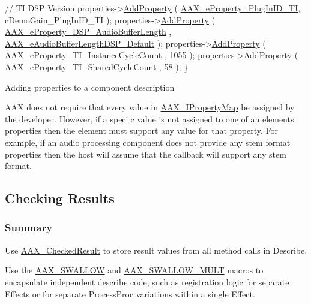 \begin{DoxyCode}
    \textcolor{comment}{// TI DSP Version}
    properties->\hyperlink{a00112_a0997671afce9a2367662c764c1d055dd}{AddProperty} ( \hyperlink{a00283_a6571f4e41a5dd06e4067249228e2249ea75f174df4efbeca86eaada126c1d9214}{AAX\_eProperty\_PlugInID\_TI}, 
      cDemoGain\_PlugInID\_TI );
    properties->\hyperlink{a00112_a0997671afce9a2367662c764c1d055dd}{AddProperty} ( \hyperlink{a00283_a6571f4e41a5dd06e4067249228e2249ea09fbd1cbcae0e86ad81005258dc1b67e}{AAX\_eProperty\_DSP\_AudioBufferLength}
      , \hyperlink{a00206_ab33e0f1ecf04ca4161fa8d8de5845d67ad1a72546e5300b5c64a19e8e41d12e15}{AAX\_eAudioBufferLengthDSP\_Default} );
    properties->\hyperlink{a00112_a0997671afce9a2367662c764c1d055dd}{AddProperty} ( \hyperlink{a00283_a6571f4e41a5dd06e4067249228e2249ea5d8e5be9f3698a9c67a578c29da66405}{AAX\_eProperty\_TI\_InstanceCycleCount}
      , 1055 );
    properties->\hyperlink{a00112_a0997671afce9a2367662c764c1d055dd}{AddProperty} ( \hyperlink{a00283_a6571f4e41a5dd06e4067249228e2249ea3e5b289333ba49f5a33de40d89fa4ade}{AAX\_eProperty\_TI\_SharedCycleCount}
      , 58 );
\}
\end{DoxyCode}
 Adding properties to a component description

 A\+A\+X does not require that every value in \hyperlink{a00112}{A\+A\+X\+\_\+\+I\+Property\+Map} be assigned by the developer. However, if a specic value is not assigned to one of an element\textquotesingle{}s properties then the element must support any value for that property. For example, if an audio processing component does not provide any stem format properties then the host will assume that the callback will support any stem format.



 \hypertarget{a00326_describe_checking_results}{}\subsection{Checking Results}\label{a00326_describe_checking_results}
\hypertarget{a00326_describe_checking_results_summary}{}\subsubsection{Summary}\label{a00326_describe_checking_results_summary}

\begin{DoxyItemize}
\item Use \hyperlink{a00019}{A\+A\+X\+\_\+\+Checked\+Result} to store result values from all method calls in Describe.
\item Use the \hyperlink{a00208_a8f177823e9388c5163d1b402a9069bce}{A\+A\+X\+\_\+\+S\+W\+A\+L\+L\+O\+W} and \hyperlink{a00208_aef6db72a3774d079609f94720928cdd6}{A\+A\+X\+\_\+\+S\+W\+A\+L\+L\+O\+W\+\_\+\+M\+U\+L\+T} macros to encapsulate independent describe code, such as registration logic for separate Effects or for separate Process\+Proc variations within a single Effect.
\end{DoxyItemize}

